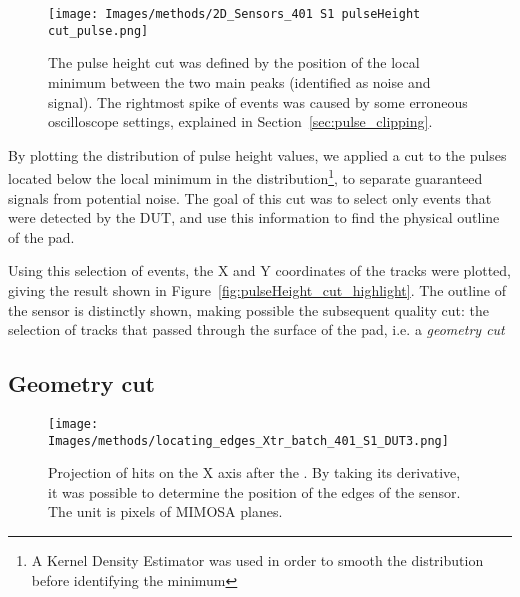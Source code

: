 \begin{figure}[h!tbp]
    \centering
    \texttt{[image: Images/methods/2D\_Sensors\_401 S1 pulseHeight cut\_pulse.png]}
    \captionsetup{width=\captionwidth}
    \caption{The pulse height cut was defined by the position of the local minimum between the two main peaks (identified as noise and signal). The rightmost spike of events was caused by some erroneous oscilloscope settings, explained in Section~\ref{sec:pulse_clipping}.}
    \label{fig:pulseHeight_cut}
\end{figure}

By plotting the distribution of pulse height values, we applied a cut to the pulses located below the local minimum in the distribution\footnote{A Kernel Density Estimator was used in order to smooth the distribution before identifying the minimum}, to separate guaranteed signals from potential noise. The goal of this cut was to select only events that were detected by the DUT, and use this information to find the physical outline of the pad.

Using this selection of events, the X and Y coordinates of the tracks were plotted, giving the result shown in Figure~\ref{fig:pulseHeight_cut_highlight}. The outline of the sensor is distinctly shown, making possible the subsequent quality cut: the selection of tracks that passed through the surface of the pad, i.e. a \textit{geometry cut}

\subsection{Geometry cut}\label{sec:geometry_cut}

\begin{figure}[h!tbp]
    \centering
    \texttt{[image: Images/methods/locating\_edges\_Xtr\_batch\_401\_S1\_DUT3.png]}
    \captionsetup{width=\captionwidth}
    \caption{Projection of hits on the X axis after the . By taking its derivative, it was possible to determine the position of the edges of the sensor. The unit is pixels of MIMOSA planes.}
    \label{fig:edges_of_the_sensor}
\end{figure}

